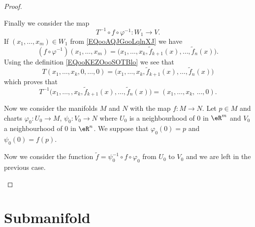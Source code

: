 \begin{proof}
\begin{subproof}
\begin{subproof}

			Finally we consider the map
			\begin{equation}
				T^{-1}\circ f\circ \varphi^{-1}\colon W_1 \to V.
			\end{equation}
			If \( (x_1,\ldots, x_m)\in W_1\) from \eqref{EQooAQJGooLqlnXJ} we have
			\begin{equation}
				(f\circ \varphi^{-1})(x_1,\ldots, x_m)=\big( x_1,\ldots, x_k,\tilde f_{k+1}(x),\ldots, \tilde f_n(x) \big).
			\end{equation}
			Using the definition \eqref{EQooKEZOooSOTBlo} we see that
			\begin{equation}
				T(x_1,\ldots, x_k,0,\ldots, 0)=\big( x_1,\ldots, x_k,\tilde f_{k+1}(x),\ldots, \tilde f_n(x) \big)
			\end{equation}
			which proves that
			\begin{equation}
				T^{-1}\big( x_1,\ldots, ,x_k,\tilde f_{k+1}(x),\ldots, \tilde f_n(x) \big)=(x_1,\ldots, x_k,\,\ldots, 0).
			\end{equation}
		\end{subproof}


		Now we consider the manifolds \( M\) and \( N\) with the map \( f\colon M\to N\). Let \( p\in M\) and charts \( \varphi_0\colon U_0\to M\), \( \psi_0\colon V_0\to N\) where \( U_0\) is a neighbourhood of \( 0\) in \( \eR^m\) and \( V_0\) a neighbourhood of \( 0\) in \( \eR^n\). We suppose that \( \varphi_0(0)=p\) and \( \psi_0(0)=f(p)\).

		Now we consider the function \( \tilde f=\psi_0^{-1}\circ f\circ \varphi_0\) from \( U_0\) to \( V_0\) and we are left in the previous case.
	\end{subproof}
\end{proof}


\section{Submanifold}


